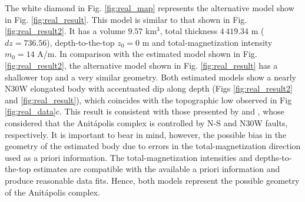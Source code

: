 The white diamond in Fig. \ref{fig:real_map} represents the alternative model 
show in Fig. \ref{fig:real_result}. This model is similar to that shown in 
Fig. \ref{fig:real_result2}. It has a volume $ 9.57 $ km$ ^3 $, total thickness 
$ 4\,419.34 $ m ($ dz = 736.56 $), depth-to-the-top $z_0 = 0$ m and 
total-magnetization intensity $m_0 = 14$ A/m. 
In comparison with the estimated model shown in Fig. \ref{fig:real_result2}, the 
alternative model shown in Fig. \ref{fig:real_result} has a shallower top and a 
very similar geometry.
Both estimated models show a nearly N30W elongated body with accentuated dip 
along depth (Figs \ref{fig:real_result2} and \ref{fig:real_result}), 
which coincides with the topographic low observed in Fig \ref{fig:real_data}c. 
This result is consistent with those presented by 
\citet{melcher-coutinho1966} and \citet{horbach-marimon1980}, whose considered that 
the Anit{\'a}polis complex is controlled by N-S and N30W faults, respectively.
It is important to bear in mind, however, the possible bias in the geometry of the
estimated body due to errors in the total-magnetization direction used as 
a priori information.
The total-magnetization intensities and depths-to-the-top estimates are compatible with 
the available a priori information and produce reasonable data fits.
Hence, both models represent the possible geometry of the Anit{\'a}polis complex. 